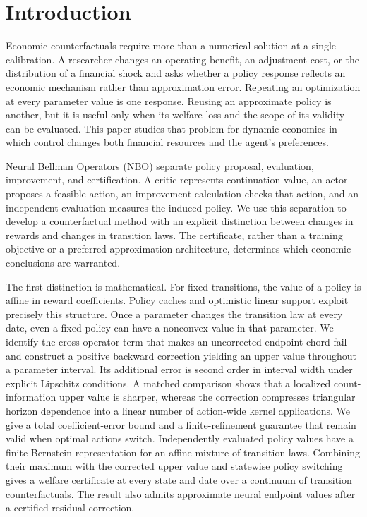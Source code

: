 \section{Introduction}
Economic counterfactuals require more than a numerical solution at a single calibration. A researcher changes an operating benefit, an adjustment cost, or the distribution of a financial shock and asks whether a policy response reflects an economic mechanism rather than approximation error. Repeating an optimization at every parameter value is one response. Reusing an approximate policy is another, but it is useful only when its welfare loss and the scope of its validity can be evaluated. This paper studies that problem for dynamic economies in which control changes both financial resources and the agent's preferences.

Neural Bellman Operators (NBO) separate policy proposal, evaluation, improvement, and certification. A critic represents continuation value, an actor proposes a feasible action, an improvement calculation checks that action, and an independent evaluation measures the induced policy. We use this separation to develop a counterfactual method with an explicit distinction between changes in rewards and changes in transition laws. The certificate, rather than a training objective or a preferred approximation architecture, determines which economic conclusions are warranted.

The first distinction is mathematical. For fixed transitions, the value of a policy is affine in reward coefficients. Policy caches and optimistic linear support exploit precisely this structure. Once a parameter changes the transition law at every date, even a fixed policy can have a nonconvex value in that parameter. We identify the cross-operator term that makes an uncorrected endpoint chord fail and construct a positive backward correction yielding an upper value throughout a parameter interval. Its additional error is second order in interval width under explicit Lipschitz conditions. A matched comparison shows that a localized count-information upper value is sharper, whereas the correction compresses triangular horizon dependence into a linear number of action-wide kernel applications. We give a total coefficient-error bound and a finite-refinement guarantee that remain valid when optimal actions switch. Independently evaluated policy values have a finite Bernstein representation for an affine mixture of transition laws. Combining their maximum with the corrected upper value and statewise policy switching gives a welfare certificate at every state and date over a continuum of transition counterfactuals. The result also admits approximate neural endpoint values after a certified residual correction.

